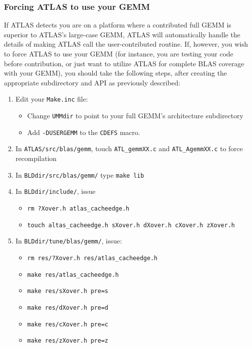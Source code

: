 \documentclass[11pt]{article}
\begin{document}
\subsubsection{Forcing ATLAS to use your GEMM}
\label{sec-force}

If ATLAS detects you are on a platform where a contributed full GEMM is
superior to ATLAS's large-case GEMM, ATLAS will automatically handle
the details of making ATLAS call the user-contributed routine.  If,
however, you wish to force ATLAS to use your GEMM (for instance, you
are testing your code before contribution, or just want to utilize ATLAS
for complete BLAS coverage with your GEMM), you should take
the following steps, after creating the appropriate subdirectory and
API as previously described:
\begin{enumerate}
\item Edit your {\tt Make.inc} file: 
 \begin{itemize}
 \item Change {\tt UMMdir} to point to your full GEMM's architecture
       subdirectory
 \item Add {\tt -DUSERGEMM} to the {\tt CDEFS} macro.
 \end{itemize}
\item In {\tt ATLAS/src/blas/gemm}, touch {\tt ATL\_gemmXX.c} and
{\tt ATL\_AgemmXX.c} to force recompilation
\item In {\tt BLDdir/src/blas/gemm/} type {\tt make lib}
\item In {\tt BLDdir/include/}, issue 
  \begin{itemize}
   \item {\tt rm ?Xover.h atlas\_cacheedge.h}
   \item {\tt touch altas\_cacheedge.h sXover.h dXover.h cXover.h zXover.h}
  \end{itemize}
\item In {\tt BLDdir/tune/blas/gemm/}, issue:
  \begin{itemize}
  \item {\tt rm res/?Xover.h res/atlas\_cacheedge.h}
  \item {\tt make res/atlas\_cacheedge.h}
  \item {\tt make res/sXover.h pre=s}
  \item {\tt make res/dXover.h pre=d}
  \item {\tt make res/cXover.h pre=c}
  \item {\tt make res/zXover.h pre=z}
  \end{itemize}
\end{enumerate}
\end{document}

